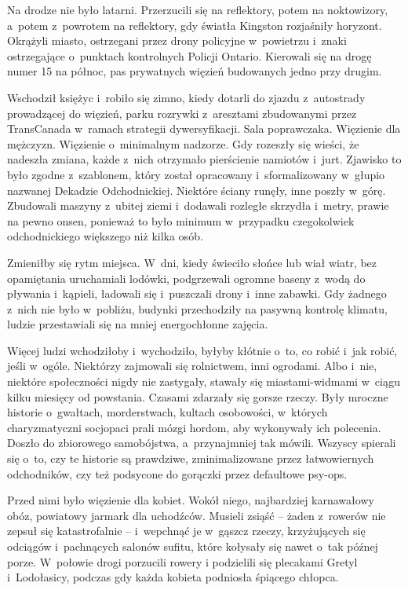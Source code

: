 \documentclass[oneside,polish,11pt,sfheadings]{mwbk}
\begin{document}
Na drodze nie było latarni. Przerzucili się na reflektory, potem na
noktowizory, a~potem z~powrotem na reflektory, gdy światła Kingston
rozjaśniły horyzont. Okrążyli miasto, ostrzegani przez drony policyjne w~powietrzu i~znaki ostrzegające o~punktach kontrolnych Policji Ontario.
Kierowali się na drogę numer 15 na północ, pas prywatnych więzień
budowanych jedno przy drugim.

Wschodził księżyc i~robiło się zimno, kiedy dotarli do zjazdu z~autostrady prowadzącej do więzień, parku rozrywki z~aresztami
zbudowanymi przez TransCanada w~ramach strategii dywersyfikacji. Sala
poprawczaka. Więzienie dla mężczyzn. Więzienie o~minimalnym nadzorze.
Gdy rozeszły się wieści, że nadeszła zmiana, każde z~nich otrzymało
pierścienie namiotów i~jurt. Zjawisko to było zgodne z~szablonem, który
został opracowany i~sformalizowany w~głupio nazwanej Dekadzie
Odchodnickiej. Niektóre ściany runęły, inne poszły w~górę. Zbudowali
maszyny z~ubitej ziemi i~dodawali rozległe skrzydła i~metry, prawie na
pewno onsen, ponieważ to było minimum w~przypadku czegokolwiek
odchodnickiego większego niż kilka osób.

Zmieniłby się rytm miejsca. W~dni, kiedy świeciło słońce lub wiał wiatr,
bez opamiętania uruchamiali lodówki, podgrzewali ogromne baseny z~wodą
do pływania i~kąpieli, ładowali się i~puszczali drony i~inne zabawki.
Gdy żadnego z~nich nie było w~pobliżu, budynki przechodziły na pasywną
kontrolę klimatu, ludzie przestawiali się na mniej energochłonne
zajęcia.

Więcej ludzi wchodziłoby i~wychodziło, byłyby kłótnie o~to, co robić i~jak robić, jeśli w~ogóle. Niektórzy zajmowali się rolnictwem, inni
ogrodami. Albo i~nie, niektóre społeczności nigdy nie zastygały, stawały
się miastami-widmami w~ciągu kilku miesięcy od powstania. Czasami
zdarzały się gorsze rzeczy. Były mroczne historie o~gwałtach,
morderstwach, kultach osobowości, w~których charyzmatyczni socjopaci
prali mózgi hordom, aby wykonywały ich polecenia. Doszło do zbiorowego
samobójstwa, a~przynajmniej tak mówili. Wszyscy spierali się o~to, czy
te historie są prawdziwe, zminimalizowane przez łatwowiernych
odchodników, czy też podsycone do gorączki przez defaultowe psy-ops.

Przed nimi było więzienie dla kobiet. Wokół niego, najbardziej
karnawałowy obóz, powiatowy jarmark dla uchodźców. Musieli zsiąść -- żaden z~rowerów nie zepsuł się katastrofalnie -- i~wepchnąć je w~gąszcz
rzeczy, krzyżujących się odciągów i~pachnących salonów sufitu, które
kołysały się nawet o~tak późnej porze. W~połowie drogi porzucili rowery
i podzielili się plecakami Gretyl i~Lodołasicy, podczas gdy każda
kobieta podniosła śpiącego chłopca.
\end{document}
